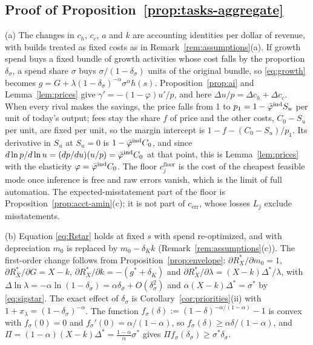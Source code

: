 \subsection*{Proof of Proposition~\ref{prop:tasks-aggregate}}

(a) The changes in $c_h$, $c_c$, $a$ and $k$ are accounting identities per dollar of revenue, with builds treated as fixed costs as in Remark~\ref{rem:assumptions}(a). If growth spend buys a fixed bundle of growth activities whose cost falls by the proportion $\delta_\sigma$, a spend share $\sigma$ buys $\sigma/(1-\delta_\sigma)$ units of the original bundle, so \eqref{eq:growth} becomes $g=G+\lambda(1-\delta_\sigma)^{-\alpha}\sigma^{\alpha}h(s)$. Proposition~\ref{prop:ai} and Lemma~\ref{lem:prices} give $\gamma'=-(1-\varphi)u'/p$, and here $\Delta u/p=\Delta c_h+\Delta c_c$. When every rival makes the savings, the price falls from 1 to $p_1=1-\bar\varphi^{\rm ind}S_u$ per unit of today's output; fees stay the share $f$ of price and the other costs, $C_0-S_u$ per unit, are fixed per unit, so the margin intercept is $1-f-(C_0-S_u)/p_1$. Its derivative in $S_u$ at $S_u=0$ is $1-\bar\varphi^{\rm ind}C_0$, and since $d\ln p/d\ln u=(dp/du)(u/p)=\bar\varphi^{\rm ind}C_0$ at that point, this is Lemma~\ref{lem:prices} with the elasticity $\varphi=\bar\varphi^{\rm ind}C_0$. The floor $c^{\mathrm{floor}}_j$ is the cost of the cheapest feasible mode once inference is free and raw errors vanish, which is the limit of full automation. The expected-misstatement part of the floor is Proposition~\ref{prop:acct-amin}(c); it is not part of $c_{\mathrm{err}}$, whose losses $L_j$ exclude misstatements.

(b) Equation \eqref{eq:Rstar} holds at fixed $s$ with spend re-optimized, and with depreciation $m_0$ is replaced by $m_0-\delta_Kk$ (Remark~\ref{rem:assumptions}(c)). The first-order change follows from Proposition~\ref{prop:envelope}: $\partial R^*_X/\partial m_0=1$, $\partial R^*_X/\partial G=X-k$, $\partial R^*_X/\partial k=-(g^*+\delta_K)$ and $\partial R^*_X/\partial\lambda=(X-k)\Delta^*/\lambda$, with $\Delta\ln\lambda=-\alpha\ln(1-\delta_\sigma)=\alpha\delta_\sigma+O(\delta_\sigma^2)$ and $\alpha(X-k)\Delta^*=\sigma^*$ by \eqref{eq:sigstar}. The exact effect of $\delta_\sigma$ is Corollary~\ref{cor:priorities}(ii) with $1+x_\lambda=(1-\delta_\sigma)^{-\alpha}$. The function $f_\sigma(\delta):=(1-\delta)^{-\alpha/(1-\alpha)}-1$ is convex with $f_\sigma(0)=0$ and $f_\sigma'(0)=\alpha/(1-\alpha)$, so $f_\sigma(\delta)\ge\alpha\delta/(1-\alpha)$, and $\Pi=(1-\alpha)(X-k)\Delta^*=\frac{1-\alpha}{\alpha}\sigma^*$ gives $\Pi f_\sigma(\delta_\sigma)\ge\sigma^*\delta_\sigma$.

